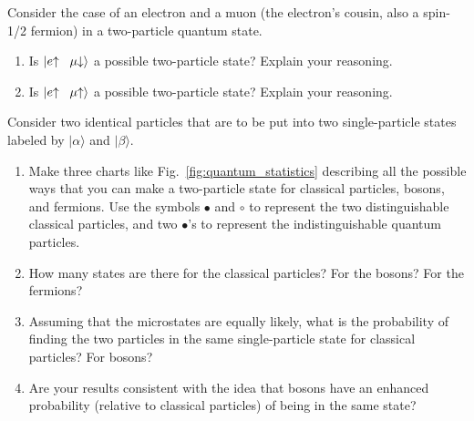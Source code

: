 \begin{problem}
  Consider the case of an electron and a muon (the electron's cousin,
  also a spin-1/2 fermion) in a two-particle quantum state.
  \begin{enumerate}
  \item Is $|e\hspace{-1mm}\uparrow\hspace{2mm} \mu\hspace{-1mm}\downarrow\rangle$ a possible
    two-particle state?  Explain your reasoning.
  \item Is $|e\hspace{-1mm}\uparrow\hspace{2mm} \mu\hspace{-1mm}\uparrow\rangle$ a possible
    two-particle state?  Explain your reasoning.
  \end{enumerate}
\end{problem}

\begin{problem}
  Consider two identical particles that are to be put into two single-particle
  states labeled by $|\alpha\rangle$ and $|\beta\rangle$.
  \begin{enumerate}
  \item Make three charts like Fig.~\ref{fig:quantum_statistics}
    describing all the possible ways that you can make a two-particle
    state for classical particles, bosons, and fermions.  Use the symbols
    $\bullet$ and $\circ$ to represent the two distinguishable
    classical particles, and two $\bullet$'s to represent the
    indistinguishable quantum particles.  

 \item How many states are there
    for the classical particles?  For the bosons?  For the fermions?

  \item Assuming that the microstates are equally likely, what is the
    probability of finding the two particles in the same
    single-particle state for classical particles?  For bosons?

  \item Are your results consistent with the idea that bosons have an
    enhanced probability (relative to classical particles) of being in
    the same state?
  \end{enumerate}
\end{problem}



